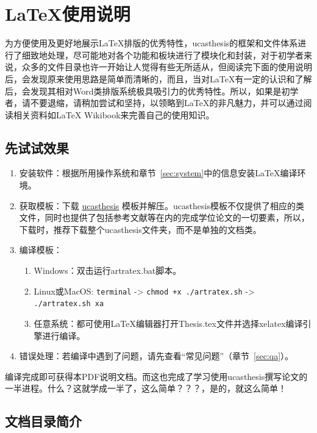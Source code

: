 \chapter{\LaTeX{}使用说明}\label{chap:guide}

为方便使用及更好地展示\LaTeX{}排版的优秀特性，ucasthesis的框架和文件体系进行了细致地处理，尽可能地对各个功能和板块进行了模块化和封装，对于初学者来说，众多的文件目录也许一开始让人觉得有些无所适从，但阅读完下面的使用说明后，会发现原来使用思路是简单而清晰的，而且，当对\LaTeX{}有一定的认识和了解后，会发现其相对Word类排版系统极具吸引力的优秀特性。所以，如果是初学者，请不要退缩，请稍加尝试和坚持，以领略到\LaTeX{}的非凡魅力，并可以通过阅读相关资料如\LaTeX{} Wikibook\citep{wikibook2014latex}来完善自己的使用知识。

\section{先试试效果}

\begin{enumerate}
    \item 安装软件：根据所用操作系统和章节~\ref{sec:system}中的信息安装\LaTeX{}编译环境。
    \item 获取模板：下载 \href{https://github.com/mohuangrui/ucasthesis}{ucasthesis} 模板并解压。ucasthesis模板不仅提供了相应的类文件，同时也提供了包括参考文献等在内的完成学位论文的一切要素，所以，下载时，推荐下载整个ucasthesis文件夹，而不是单独的文档类。
    \item 编译模板：
        \begin{enumerate}
            \item Windows：双击运行artratex.bat脚本。
                \item Linux或MacOS: {\scriptsize \verb|terminal| -> \verb|chmod +x ./artratex.sh| -> \verb|./artratex.sh xa|}
            \item 任意系统：都可使用\LaTeX{}编辑器打开Thesis.tex文件并选择xelatex编译引擎进行编译。
        \end{enumerate}
    \item 错误处理：若编译中遇到了问题，请先查看“常见问题”（章节~\ref{sec:qa}）。
\end{enumerate}

编译完成即可获得本PDF说明文档。而这也完成了学习使用ucasthesis撰写论文的一半进程。什么？这就学成一半了，这么简单？？？，是的，就这么简单！

\section{文档目录简介}

